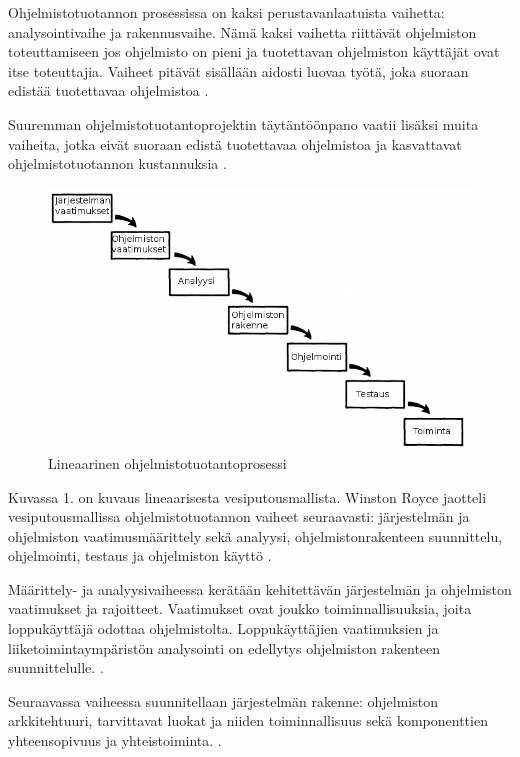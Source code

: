 \documentclass[finnish]{tktltiki2}
\theoremstyle{definition}
\theoremstyle{remark}
\begin{document}
Ohjelmistotuotannon prosessissa on kaksi perustavanlaatuista vaihetta: analysointivaihe ja rakennusvaihe. Nämä kaksi vaihetta riittävät ohjelmiston toteuttamiseen jos ohjelmisto on pieni ja tuotettavan ohjelmiston käyttäjät ovat itse toteuttajia. Vaiheet pitävät sisällään aidosti luovaa työtä, joka suoraan edistää tuotettavaa ohjelmistoa \cite{ROY70}.

Suuremman ohjelmistotuotantoprojektin täytäntöönpano vaatii lisäksi muita vaiheita, jotka eivät suoraan edistä tuotettavaa ohjelmistoa ja kasvattavat ohjelmistotuotannon kustannuksia \cite{ROY70}.

\begin{figure}[h!]
  \caption{Lineaarinen ohjelmistotuotantoprosessi}
  \centering
    \includegraphics[width=\textwidth]{waterfall}
\end{figure}

Kuvassa 1. on kuvaus lineaarisesta vesiputousmallista. Winston Royce jaotteli vesiputousmallissa ohjelmistotuotannon vaiheet seuraavasti: järjestelmän ja ohjelmiston vaatimusmäärittely sekä analyysi, ohjelmistonrakenteen suunnittelu, ohjelmointi, testaus ja ohjelmiston käyttö \cite{ROY70}.

Määrittely- ja analyysivaiheessa kerätään kehitettävän järjestelmän ja ohjelmiston vaatimukset ja rajoitteet. Vaatimukset ovat joukko toiminnallisuuksia, joita loppukäyttäjä odottaa ohjelmistolta. Loppukäyttäjien vaatimuksien ja liiketoimintaympäristön analysointi on edellytys ohjelmiston rakenteen suunnittelulle. \cite{ROY70}.

Seuraavassa vaiheessa suunnitellaan järjestelmän rakenne: ohjelmiston arkkitehtuuri, tarvittavat luokat ja niiden toiminnallisuus sekä komponenttien yhteensopivuus ja yhteistoiminta. \cite{ROY70}.
\end{document}
